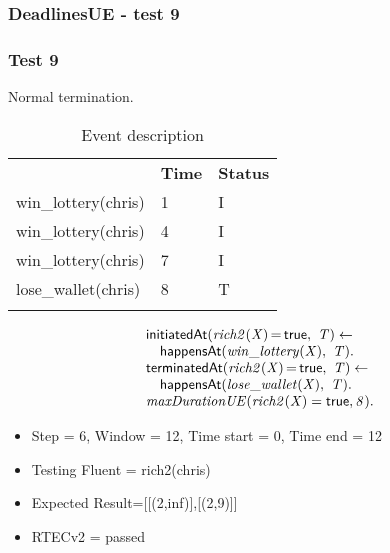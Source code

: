\documentclass[8pt]{beamer}
\DeclareMathOperator{\val}{=}  %
\def \patsize {}
\def\happensAt{\textsf{\patsize happensAt}}
\def\initiatedAt{\textsf{\patsize initiatedAt}}
\def\terminatedAt{\textsf{\patsize terminatedAt}}
\def\true{\textsf{\patsize true}}
\newenvironment{mysplit}%
  {\arraycolsep 0pt \begin{array}{l}}%
  {\end{array}}
\begin{document}
\begin{frame}
    \frametitle{DeadlinesUE - test 9}
    \subsubsection{Test 9}
    \small
    Normal termination.\linebreak
    \begin{minipage}{0.48\linewidth}
        \begin{table}[t!]
            \caption{Event description}
            \begin{center}

                \begin{tabular}{lll}
                    \hline\noalign{\smallskip}
                    \multicolumn{1}{l}{\textbf{Event}} & \multicolumn{1}{c}{\textbf{Time}} & \multicolumn{1}{c}{\textbf{Status}} \\
                    win\_lottery(chris)& 1 & I\\
                    win\_lottery(chris)& 4 & I\\
                    win\_lottery(chris)& 7 & I\\
                    lose\_wallet(chris)& 8 & T\\
                    \noalign{\smallskip}
                    \hline
                \end{tabular}
            \end{center}
        \end{table}
    \end{minipage}
    \begin{minipage}{0.48\linewidth}
        \begin{align*}
            \begin{mysplit}
                \initiatedAt\mathit{(rich2(X)\val\true,\ T) \leftarrow}\\
                \quad    \happensAt\mathit{(win\_lottery(X),\ T)}.\\
                \terminatedAt\mathit{(rich2(X)\val\true,\ T) \leftarrow}\\
                \quad    \happensAt\mathit{(lose\_wallet(X),\ T)}.\\
                \mathit{maxDurationUE(rich2(X)=\true,8)}.\\
            \end{mysplit}
        \end{align*}
    \end{minipage}
    \begin{itemize}
        \item Step = 6, Window = 12, Time start = 0, Time end = 12
        \item Testing Fluent = rich2(chris)
        \item Expected Result=[[(2,inf)],[(2,9)]]
        \item RTECv2 = passed
    \end{itemize}
\end{frame}
\end{document}
